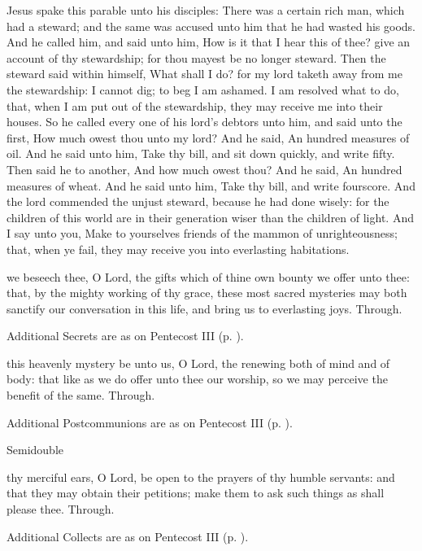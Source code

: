  Jesus spake this parable unto his disciples: There was a certain rich man, which had a steward; and the same was accused unto him that he had wasted his goods. And he called him, and said unto him, How is it that I hear this of thee? give an account of thy stewardship; for thou mayest be no longer steward. Then the steward said within himself, What shall I do? for my lord taketh away from me the stewardship: I cannot dig; to beg I am ashamed. I am resolved what to do, that, when I am put out of the stewardship, they may receive me into their houses. So he called every one of his lord's debtors unto him, and said unto the first, How much owest thou unto my lord? And he said, An hundred measures of oil. And he said unto him, Take thy bill, and sit down quickly, and write fifty. Then said he to another, And how much owest thou? And he said, An hundred measures of wheat. And he said unto him, Take thy bill, and write fourscore. And the lord commended the unjust steward, because he had done wisely: for the children of this world are in their generation wiser than the children of light. And I say unto you, Make to yourselves friends of the mammon of unrighteousness; that, when ye fail, they may receive you into everlasting habitations.

\secret
{} we beseech thee, O Lord, the gifts which of thine own bounty we offer unto thee: that, by the mighty working of thy grace, these most sacred mysteries may both sanctify our conversation in this life, and bring us to everlasting joys. Through.
\begin{rubric}
    Additional Secrets are as on Pentecost III (p. \pageref{PentecostIII}).
\end{rubric}

\postcommunion
{} this heavenly mystery be unto us, O Lord, the renewing both of mind and of body: that like as we do offer unto thee our worship, so we may perceive the benefit of the same. Through.
\begin{rubric}
    Additional Postcommunions are as on Pentecost III (p. \pageref{PentecostIII}).
\end{rubric}

\begin{inhead}
{Semidouble}
\end{inhead}

\collect
{} thy merciful ears, O Lord, be open to the prayers of thy humble servants: and that they may obtain their petitions; make them to ask such things as shall please thee. Through.
\begin{rubric}
    Additional Collects are as on Pentecost III (p. \pageref{PentecostIII}).
\end{rubric}

